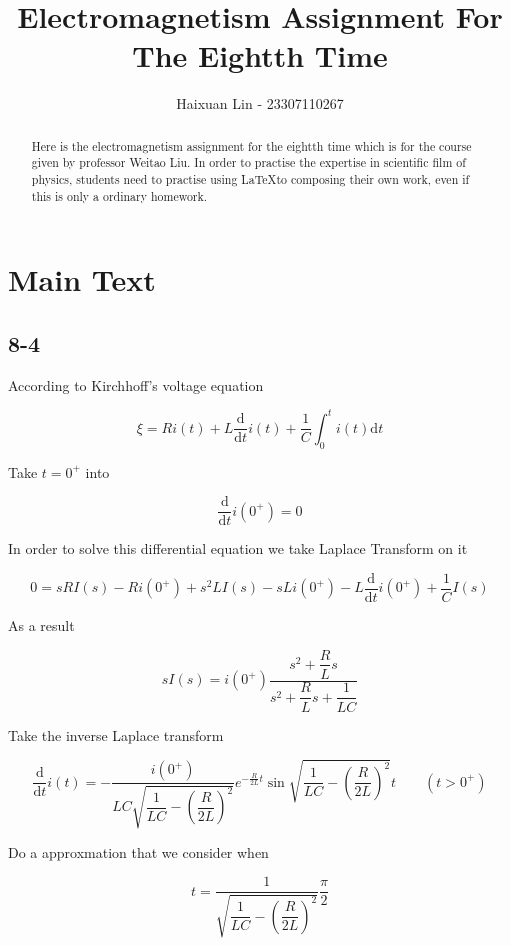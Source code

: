 \documentclass[a4paper,11pt]{amsart}
\title{Electromagnetism Assignment For The Eightth Time}
\author{Haixuan Lin - 23307110267}
\theoremstyle{definition}
\begin{document}
	
	\begin{abstract}
		Here is the electromagnetism assignment for the eightth time which is for the course given by professor Weitao Liu. In order to practise the expertise in scientific film of physics, students need to practise using \LaTeX to composing their own work, even if this is only a ordinary homework.
	\end{abstract}
	
	\maketitle
	\section*{Main Text}

	\subsection*{8-4}
	
	According to Kirchhoff's voltage equation
	
	$$
	\xi =Ri\left( t \right) +L\frac{\mathrm{d}}{\mathrm{d}t}i\left( t \right) +\frac{1}{C}\int_0^t{i\left( t \right) \mathrm{d}t}
	$$
	
	Take $t=0^+$ into
	
	$$
	\frac{\mathrm{d}}{\mathrm{d}t}i\left( 0^+ \right) =0
	$$
	
	In order to solve this differential equation we take Laplace Transform on it
	
	$$
	0=sRI\left( s \right) -Ri\left( 0^+ \right) +s^2LI\left( s \right) -sLi\left( 0^+ \right) -L\frac{\mathrm{d}}{\mathrm{d}t}i\left( 0^+ \right) +\frac{1}{C}I\left( s \right) 
	$$
	
	As a result
	
	$$
	\displaystyle sI\left( s \right) =i\left( 0^+ \right) \frac{s^2+\dfrac{R}{L}s}{s^2+\dfrac{R}{L}s+\dfrac{1}{LC}}
	$$
	
	Take the inverse Laplace transform
	
	$$
	\frac{\mathrm{d}}{\mathrm{d}t}i\left( t \right) =-\frac{i\left( 0^+ \right)}{LC\sqrt{\dfrac{1}{LC}-\left( \dfrac{R}{2L} \right) ^2}}e^{-\tfrac{R}{2L}t}\sin \sqrt{\frac{1}{LC}-\left( \frac{R}{2L} \right) ^2}t\qquad(t>0^+)
	$$
	
	Do a approxmation that we consider when
	
	$$
	t=\frac{1}{\sqrt{\dfrac{1}{LC}-\left( \dfrac{R}{2L} \right) ^2}}\frac{\pi}{2}
	$$
	
\end{document}
